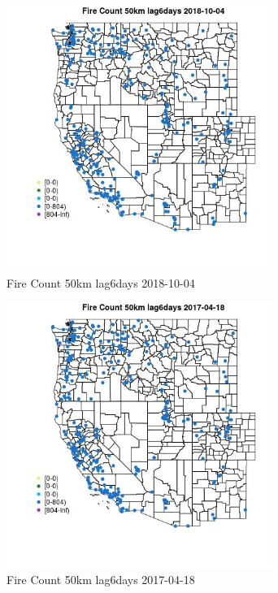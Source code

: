 \begin{figure} 
\centering  
\includegraphics[width=0.77\textwidth]{Code_Outputs/Report_ML_input_PM25_Step4_part_f_de_duplicated_aveswNAs_MapObsFire_Count_50km_lag6days2018-10-04.jpg} 
\caption{\label{fig:Report_ML_input_PM25_Step4_part_f_de_duplicated_aveswNAsMapObsFire_Count_50km_lag6days2018-10-04}Fire Count 50km lag6days 2018-10-04} 
\end{figure} 
 

\begin{figure} 
\centering  
\includegraphics[width=0.77\textwidth]{Code_Outputs/Report_ML_input_PM25_Step4_part_f_de_duplicated_aveswNAs_MapObsFire_Count_50km_lag6days2017-04-18.jpg} 
\caption{\label{fig:Report_ML_input_PM25_Step4_part_f_de_duplicated_aveswNAsMapObsFire_Count_50km_lag6days2017-04-18}Fire Count 50km lag6days 2017-04-18} 
\end{figure} 
 


